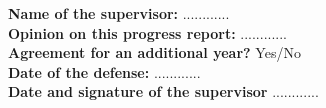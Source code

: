 \documentclass[11pt]{article}
\begin{document}
\noindent\textbf{Name of the supervisor:}
............
\\

\noindent\textbf{Opinion on this progress report:}
............
\\

\noindent\textbf{Agreement for an additional year?}
Yes/No
\\

\noindent\textbf{Date of the defense:}
............
\\

\bigskip
\bigskip
\noindent\textbf{Date and signature of the supervisor}
............
\end{document}
